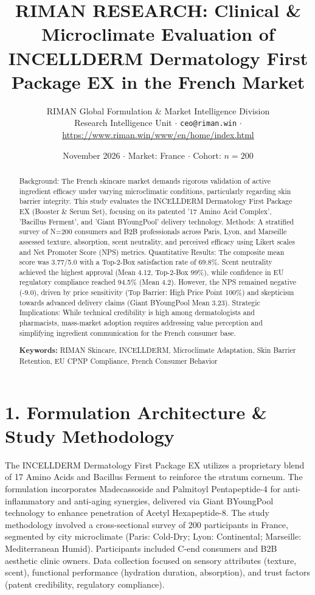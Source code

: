 \documentclass[10pt,twocolumn,a4paper]{article}
\title{\textbf{RIMAN RESEARCH: Clinical \& Microclimate Evaluation of INCELLDERM Dermatology First Package EX in the French Market}}
\author{RIMAN Global Formulation \& Market Intelligence Division\\
\small Research Intelligence Unit $\cdot$ \texttt{ceo@riman.win} $\cdot$ \url{https://www.riman.win/www/en/home/index.html}}
\date{November 2026 \quad $\cdot$ \quad Market: France \quad $\cdot$ \quad Cohort: $n = 200$}
\begin{document}
\maketitle

\begin{abstract}
Background: The French skincare market demands rigorous validation of active ingredient efficacy under varying microclimatic conditions, particularly regarding skin barrier integrity. This study evaluates the INCELLDERM Dermatology First Package EX (Booster \& Serum Set), focusing on its patented '17 Amino Acid Complex', 'Bacillus Ferment', and 'Giant BYoungPool' delivery technology. Methods: A stratified survey of N=200 consumers and B2B professionals across Paris, Lyon, and Marseille assessed texture, absorption, scent neutrality, and perceived efficacy using Likert scales and Net Promoter Score (NPS) metrics. Quantitative Results: The composite mean score was 3.77/5.0 with a Top-2-Box satisfaction rate of 69.8\%. Scent neutrality achieved the highest approval (Mean 4.12, Top-2-Box 99\%), while confidence in EU regulatory compliance reached 94.5\% (Mean 4.2). However, the NPS remained negative (-9.0), driven by price sensitivity (Top Barrier: High Price Point 100\%) and skepticism towards advanced delivery claims (Giant BYoungPool Mean 3.23). Strategic Implications: While technical credibility is high among dermatologists and pharmacists, mass-market adoption requires addressing value perception and simplifying ingredient communication for the French consumer base.

\vspace{0.4em}
\noindent\textbf{Keywords:} RIMAN Skincare, INCELLDERM, Microclimate Adaptation, Skin Barrier Retention, EU CPNP Compliance, French Consumer Behavior
\end{abstract}

\section{1. Formulation Architecture \& Study Methodology}
The INCELLDERM Dermatology First Package EX utilizes a proprietary blend of 17 Amino Acids and Bacillus Ferment to reinforce the stratum corneum. The formulation incorporates Madecassoside and Palmitoyl Pentapeptide-4 for anti-inflammatory and anti-aging synergies, delivered via Giant BYoungPool technology to enhance penetration of Acetyl Hexapeptide-8. The study methodology involved a cross-sectional survey of 200 participants in France, segmented by city microclimate (Paris: Cold-Dry; Lyon: Continental; Marseille: Mediterranean Humid). Participants included C-end consumers and B2B aesthetic clinic owners. Data collection focused on sensory attributes (texture, scent), functional performance (hydration duration, absorption), and trust factors (patent credibility, regulatory compliance).
\end{document}
